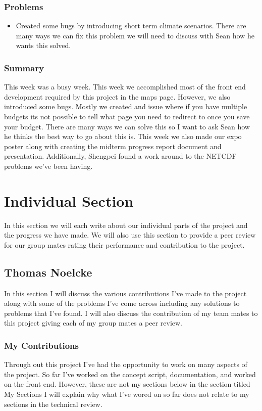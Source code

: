 \documentclass[onecolumn, draftclsnofoot,10pt, compsoc]{article}
\begin{document}
			\subsubsection{Problems}
				\begin{itemize}
					\item Created some bugs by introducing short term climate scenarios.
						\subitem There are many ways we can fix this problem we will need to discuss with Sean how he wants this solved.
				\end{itemize}
			\subsubsection{Summary} This week was a busy week. This week we accomplished most of the front end development required by this project in the maps page. However, we also introduced some bugs. Mostly we created and issue where if you have multiple budgets its not possible to tell what page you need to redirect to once you save your budget. There are many ways we can solve this so I want to ask Sean how he thinks the best way to go about this is. This week we also made our expo poster along with creating the midterm progress report document and presentation. Additionally, Shengpei found a work around to the NETCDF problems we've been having.\\
			

\section{Individual Section}
In this section we will each write about our individual parts of the project and the progress we have made. We will also use this section to provide a peer review for our group mates rating their performance and contribution to the project.\\

\subsection{Thomas Noelcke}
	In this section I will discuss the various contributions I've made to the project along with some of the problems I've come across including any solutions to problems that I’ve found. I will also discuss the contribution of my team mates to this project giving each of my group mates a peer review.\\
	
	\subsubsection{My Contributions}
		Through out this project I've had the opportunity to work on many aspects of the project. So far I've worked on the concept script, documentation, and worked on the front end. However, these are not my sections below in the section titled My Sections I will explain why what I've wored on so far does not relate to my sections in the technical review.\\
		
\end{document}
